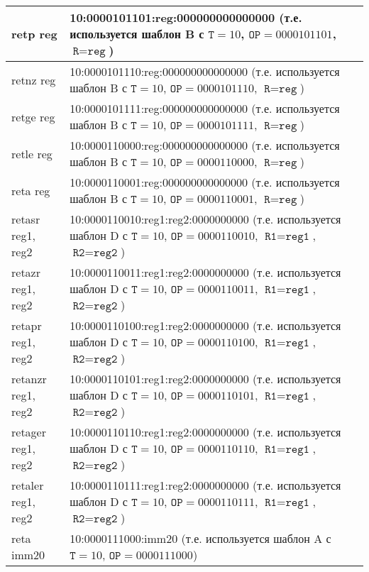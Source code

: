 \documentclass[10pt]{report}
\begin{document}
\begin{longtable}[c]{|l|p{12.5cm}|}
retp reg                        & 10:0000101101:reg:000000000000000 (т.е. используется шаблон B с $\texttt{T}=10$, $\texttt{OP}=0000101101$, $\texttt{R}=\texttt{reg}$) \\ \hline
retnz reg                       & 10:0000101110:reg:000000000000000 (т.е. используется шаблон B с $\texttt{T}=10$, $\texttt{OP}=0000101110$, $\texttt{R}=\texttt{reg}$) \\ \hline
retge reg                       & 10:0000101111:reg:000000000000000 (т.е. используется шаблон B с $\texttt{T}=10$, $\texttt{OP}=0000101111$, $\texttt{R}=\texttt{reg}$) \\ \hline
retle reg                       & 10:0000110000:reg:000000000000000 (т.е. используется шаблон B с $\texttt{T}=10$, $\texttt{OP}=0000110000$, $\texttt{R}=\texttt{reg}$) \\ \hline
reta reg                        & 10:0000110001:reg:000000000000000 (т.е. используется шаблон B с $\texttt{T}=10$, $\texttt{OP}=0000110001$, $\texttt{R}=\texttt{reg}$) \\ \hline
retasr reg1, reg2               & 10:0000110010:reg1:reg2:0000000000 (т.е. используется шаблон D с $\texttt{T}=10$, $\texttt{OP}=0000110010$, $\texttt{R1}=\texttt{reg1}$, $\texttt{R2}=\texttt{reg2}$) \\ \hline
retazr reg1, reg2               & 10:0000110011:reg1:reg2:0000000000 (т.е. используется шаблон D с $\texttt{T}=10$, $\texttt{OP}=0000110011$, $\texttt{R1}=\texttt{reg1}$, $\texttt{R2}=\texttt{reg2}$) \\ \hline
retapr reg1, reg2               & 10:0000110100:reg1:reg2:0000000000 (т.е. используется шаблон D с $\texttt{T}=10$, $\texttt{OP}=0000110100$, $\texttt{R1}=\texttt{reg1}$, $\texttt{R2}=\texttt{reg2}$) \\ \hline
retanzr reg1, reg2              & 10:0000110101:reg1:reg2:0000000000 (т.е. используется шаблон D с $\texttt{T}=10$, $\texttt{OP}=0000110101$, $\texttt{R1}=\texttt{reg1}$, $\texttt{R2}=\texttt{reg2}$) \\ \hline
retager reg1, reg2              & 10:0000110110:reg1:reg2:0000000000 (т.е. используется шаблон D с $\texttt{T}=10$, $\texttt{OP}=0000110110$, $\texttt{R1}=\texttt{reg1}$, $\texttt{R2}=\texttt{reg2}$) \\ \hline
retaler reg1, reg2              & 10:0000110111:reg1:reg2:0000000000 (т.е. используется шаблон D с $\texttt{T}=10$, $\texttt{OP}=0000110111$, $\texttt{R1}=\texttt{reg1}$, $\texttt{R2}=\texttt{reg2}$) \\ \hline
reta imm20                      & 10:0000111000:imm20 (т.е. используется шаблон A с $\texttt{T}=10$, $\texttt{OP}=0000111000$) \\ \hline

\end{longtable}
\end{document}
